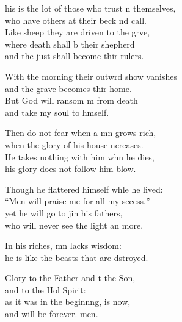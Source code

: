 \settowidth{\versewidth}{This is the lot of those who trust in themselves, *}
\begin{psalmverse}%
  \begin{patverse}
his is the lot of those who trust \pointup{\i}n themselves,\Med\\
who have others at their beck nd call.\\
Like sheep they are driven to the grve,\Flex\\
where death shall b their shepherd\Med\\
and the just shall become thir rulers.

With the morning their outwrd show vanishes\Med\\
and the grave becomes thir home.\\
But God will ransom m from death\Med\\
and take my soul to h\pointup{\i}mself.

Then do not fear when a mn grows rich,\Med\\
when the glory of his house \pointup{\i}ncreases.\\
He takes nothing with him whn he dies,\Med\\
his glory does not follow him blow.

Though he flattered himself wh\pointup{\i}le he lived:\Med\\
“Men will praise me for all my sccess,”\\
yet he will go to jin his fathers,\Med\\
who will never see the light an more.

In his riches, mn lacks wisdom:\Med\\
he is like the beasts that are dstroyed.

Glory to the Father and t the Son,\Med\\
and to the Hol Spirit:\\
as it was in the beginn\pointup{\i}ng, is now,\Med\\
and will be forever. men. 
  \end{patverse}
\end{psalmverse}
